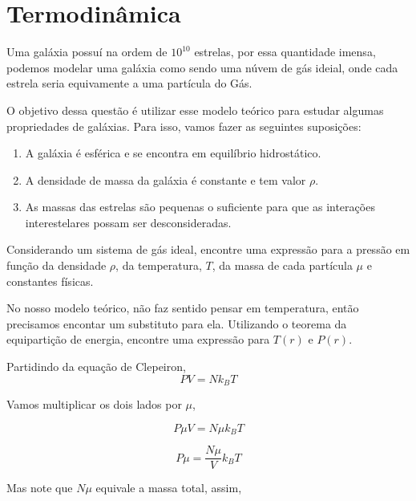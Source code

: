 \documentclass[11pt]{article}
\begin{document}
\section{Termodinâmica}
\begin{pproblem}
    Uma galáxia possuí na ordem de \(10^{10}\) estrelas, por essa quantidade imensa, podemos modelar uma galáxia como sendo uma núvem de gás ideial, onde cada estrela seria equivamente a uma partícula do Gás. 
    
    O objetivo dessa questão é utilizar esse modelo teórico para estudar algumas propriedades de galáxias. Para isso, vamos fazer as seguintes suposições:

    \begin{enumerate}[label=\roman*)]
        \item A galáxia é esférica e se encontra em equilíbrio hidrostático.
        \item A densidade de massa da galáxia é constante e tem valor \(\rho\).
        \item As massas das estrelas são pequenas o suficiente para que as interações interestelares possam ser desconsideradas.
    \end{enumerate}
    
    \begin{alternativas}
        \item Considerando um sistema de gás ideal, encontre uma expressão para a pressão em função da densidade \(\rho\), da temperatura, \(T\), da massa de cada partícula \(\mu\) e constantes físicas.
        
        \item No nosso modelo teórico, não faz sentido pensar em temperatura, então precisamos encontar um substituto para ela. Utilizando o teorema da equipartição de energia, encontre uma expressão para \(T(r)\) e \(P(r)\).
    \end{alternativas}
\begin{pssolution*}{}{}
    \begin{alternativas}
        \item Partidindo da equação de Clepeiron, 
        \[PV = Nk_BT\]

        Vamos multiplicar os dois lados por \(\mu\), 

        \[P\mu V = N\mu k_B T\]

        \[P\mu = \frac{N\mu}{V}k_BT\]

        Mas note que \(N\mu\) equivale a massa total, assim, 


\end{alternativas}
\end{pssolution*}
\end{pproblem}
\end{document}
